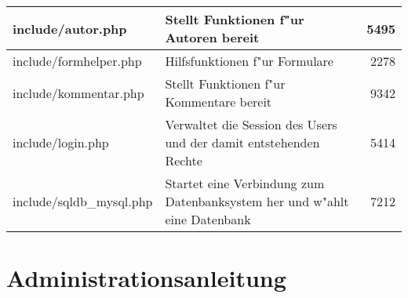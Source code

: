 \begin{longtable}{|l|p{6cm}|r|}
\hline
include/autor.php & Stellt Funktionen f"ur Autoren bereit & 5495\\
\hline
include/formhelper.php & Hilfsfunktionen f"ur Formulare & 2278\\
\hline
include/kommentar.php & Stellt Funktionen f"ur Kommentare bereit & 9342\\
\hline   
include/login.php &  Verwaltet die Session des Users und der damit entstehenden Rechte & 5414\\
\hline
include/sqldb\_mysql.php & Startet eine Verbindung zum Datenbanksystem her und w"ahlt eine Datenbank & 7212\\
\hline
\end{longtable}


\section{Administrationsanleitung}

